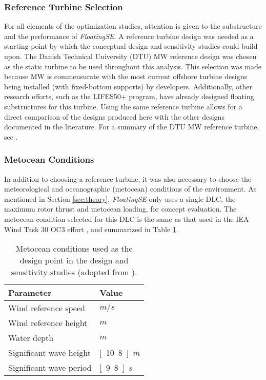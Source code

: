 \subsubsection{Reference Turbine Selection}
For all elements of the optimization studies, attention is given to the
substructure and the performance of \textit{FloatingSE}.  A reference
turbine design was needed as a starting point by which the conceptual
design and sensitivity studies could build upon.  The Danish Technical
University (DTU) \unit[10]{MW} reference design was chosen as the static
turbine to be used throughout this analysis.  This selection was made
because \unit[10]{MW} is commensurate with the most current offshore
turbine designs being installed (with fixed-bottom supports) by
developers.  Additionally, other research efforts, such as the LIFES50+
program, have already designed floating substructures for this turbine.
Using the same reference turbine allows for a direct comparison of the
designs produced here with the other designs documented in the
literature.  For a summary of the DTU \unit[10]{MW} reference turbine,
see \citet{dtu10mw}.


\subsubsection{Metocean Conditions}
In addition to choosing a reference turbine, it was also necessary to
choose the meteorological and oceanographic (metocean) conditions of the
environment.  As mentioned in Section \ref{sec:theory},
\textit{FloatingSE} only uses a single DLC, the maximum rotor thrust and
metocean loading, for concept evaluation.  The metocean condition
selected for this DLC is the same as that used in the IEA Wind Task 30
OC3 effort \citep{OC3}, and summarized in Table \ref{tbl:metocean}.

\begin{table}[htbp] \begin{center}
    \caption{Metocean conditions used as the design point in the design
      and sensitivity studies (adopted from \citet{OC3}).}
    \label{tbl:metocean}
          {\small
            \begin{tabular}{ l l } \hline
              \textbf{Parameter} & \textbf{Value} \\ \hline \hline
              Wind reference speed & \unit[11]{$m/s$} \\
              Wind reference height & \unit[119]{$m$} \\
              Water depth & \unit[320]{$m$} \\
              Significant wave height & \unit[10.8]{$m$} \\
              Significant wave period & \unit[9.8]{$s$} \\ \hline
            \end{tabular}
          }
\end{center} \end{table}


